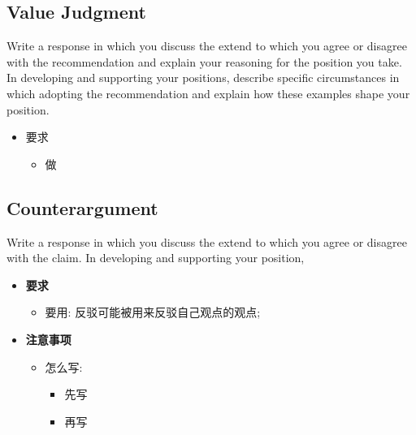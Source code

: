   \subsection{Value Judgment}

    Write a response in which you discuss the extend to which you agree
    or disagree with the recommendation and explain your reasoning for the
    position you take. In developing and supporting your positions,
    describe specific circumstances in which adopting the recommendation
     and explain how these
    examples shape your position.

    \begin{itemize}
      \item 要求
      \begin{itemize}
        \item 做
      \end{itemize}
    \end{itemize}

  \subsection{Counterargument}

    Write a response in which you discuss the extend to which you agree or
    disagree with the claim. In developing and supporting your position,

    \begin{itemize}
      \item \textbf{要求}
      \begin{itemize}
        \item 要用:  反驳可能被用来反驳自己观点的观点;
      \end{itemize}

      \item \textbf{注意事项}
      \begin{itemize}
        \item 怎么写:
        \begin{itemize}
          \item 先写
          \item 再写
        \end{itemize}
      \end{itemize}
    \end{itemize}

